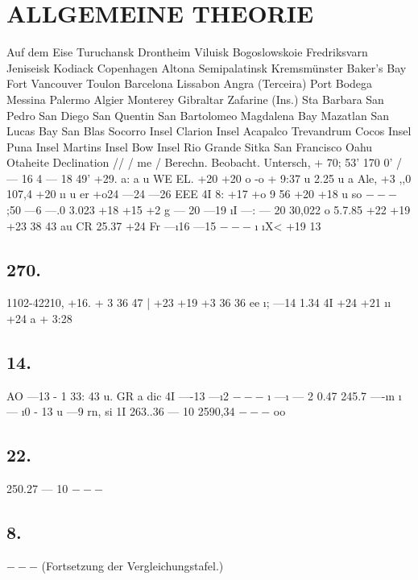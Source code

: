 \documentclass[12pt,a4paper]{article}
\begin{document}
\section*{ALLGEMEINE THEORIE}
Auf dem Eise Turuchansk Drontheim Viluisk Bogoslowskoie Fredriksvarn Jeniseisk Kodiack Copenhagen Altona Semipalatinsk Kremsmünster Baker's Bay Fort Vancouver Toulon Barcelona Lissabon Angra (Terceira) Port Bodega Messina Palermo Algier Monterey Gibraltar Zafarine (Ins.) Sta Barbara San Pedro San Diego San Quentin San Bartolomeo Magdalena Bay Mazatlan San Lucas Bay San Blas Socorro Insel Clarion Insel Acapalco Trevandrum Cocos Insel Puna Insel Martins Insel Bow Insel Rio Grande Sitka San Francisco Oahu Otaheite Declination // / me / Berechn. Beobacht. Untersch, + 70\textdegree{}; 53' 170\textdegree{} 0' / --- 16\textdegree{} 4 --- 18\textdegree{} 49' +29. a: a u WE EL. +20 +20 o -o + 9:37 u 2.25 u a Ale, +3 ,,0 107,4 +20 \i{}\i{} u er +o24 ---24 ---26 EEE 4I 8: +17 +o 9 56 +20 +18 u so
$---$
;50 ---6 ---.0 3.023 +18 +15 +2 g --- 20 ---19 \i{}I ---: --- 20 30,022 o 5.7.85 +22 +19 +23 38 43 au CR 25.37 +24 Fr ---\i{}16 ---15
$---$
\i{} \i{}X< +19 13\textdegree{}

\subsection*{270.}
1102-42210, +16. + 3 36 47 | +23 +19 +3 36 36 ee \i{}; ---14 1.34 4I +24 +21 \i{}\i{} +24 a + 3:28

\subsection*{14.}
AO ---13 - 1 33: 43 u. GR a dic 4I ----13 ---\i{}2
$---$
\i{} ---\i{} --- 2 0.47 245.7 ----\i{}n \i{} --- \i{}0 - 13 u ---9 rn, si 1I 263..36 --- 10 2590,34
$---$
oo

\subsection*{22.}
250.27 --- 10
$---$

\subsection*{8.}
$---$
(Fortsetzung der Vergleichungstafel.)
\end{document}
